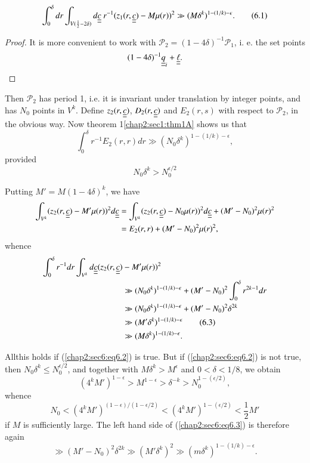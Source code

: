 \begin{lemma}\label{chap2:sec6:lem6D}
\begin{equation*}
\int_{0}^{\delta} dr \int_{V(\frac{1}{2} - 2\delta)} d\underline{\underline{c}} ~r^{-1} (z_{1}(r, \underline{\underline{c}}) - M\mu(r))^{2} \gg (M \delta^{k})^{1-(1/k) - \epsilon} .\tag{6.1}\label{chap2:sec6:eq6.1}
\end{equation*}
\end{lemma}

\begin{proof}
It is more convenient to work with $\mathscr{P}_{2} = (1-4\delta)^{-1} \mathscr{P}_{1}$, i. e. the set points
$$
(1 - 4\delta)^{-1} \underline{\underline{q}}_{i} + \underline{\underline{\ell}}.
$$
\end{proof}

Then $\mathscr{P}_{2}$ has period 1, i.e. it is invariant under translation by integer points, and has $N_{0}$ points in $V^{k}$. Define $z_{2} (r, \underline{\underline{c}})$, $D_{2}(r, \underline{\underline{c}})$ and $E_{2}(r, s)$ with respect to $\mathscr{P}_{2}$, in the obvious way. Now theorem 1\ref{chap2:sec1:thm1A} shows us that
$$
\int_{0}^{\delta} r^{-1} E_{2} (r, r) dr \gg (N_{0} \delta^{k})^{1-(1/k) -\epsilon},
$$
provided
\begin{equation*}
  N_{0} \delta^{k} > N_{0}^{\epsilon/2}\tag{6.2}\label{chap2:sec6:eq6.2}
\end{equation*}

Putting $M' = M(1 - 4\delta)^{k}$, we have
{\fontsize{10}{12}\selectfont
\begin{align*}
\int_{V^{k}} (z_{2}(r, \underline{\underline{c}}) - M'\mu(r))^{2} d\underline{\underline{c}} & = \int_{V^{k}} (z_{2}(r, \underline{\underline{c}}) - N_{0} \mu(r))^{2} d\underline{\underline{c}} + (M' - N_{0})^{2} \mu (r)^{2}\\
& = E_{2} (r, r) + (M' - N_{0})^{2} \mu (r)^{2},
\end{align*}}\relax
whence
\begin{align*}
  \int_{0}^{\delta} r^{-1} dr  \int_{V^{k}} d\underline{\underline{c}} (z_{2}(r, \underline{\underline{c}})& - M'\mu(r))^{2}\\ 
  & \gg (N_{0} \delta^{k})^{1-(1/k)-\epsilon} + (M' - N_{0})^{2} \int_{0}^{\delta} r^{2k-1} dr\\
  & \gg (N_{0} \delta^{k})^{1-(1/k)-\epsilon} + (M' - N_{0})^{2} \delta^{2k}\\
  & \gg (M' \delta^{k})^{1-(1/k)-\epsilon} \tag{6.3}\label{chap2:sec6:eq6.3}\\
  & \gg (M \delta^{k})^{1-(1/k)-\epsilon}.
\end{align*}

All\pageoriginale this holds if (\ref{chap2:sec6:eq6.2}) is true. But if (\ref{chap2:sec6:eq6.2}) is not true, then $N_{0} \delta^{k} \leq N_{0}^{\epsilon/2}$, and together with $M \delta^{k} > M^{\epsilon}$ and $0 < \delta < 1/8$, we obtain
$$
(4^{k} M')^{1-\epsilon} > M^{1-\epsilon} > \delta^{-k} > N_{0}^{1-(\epsilon/2)},
$$
whence
$$
N_{0} < (4^{k} M')^{(1-\epsilon)/(1-\epsilon/2)} < (4^{k} M')^{1-(\epsilon/2)} < \frac{1}{2} M'
$$
if $M$ is sufficiently large. The left hand side of (\ref{chap2:sec6:eq6.3}) is therefore again
$$
\gg (M' - N_{0})^{2} \delta^{2k} \gg (M'\delta^{k})^{2} \gg (m \delta^{k})^{1-(1/k)-\epsilon}.
$$

